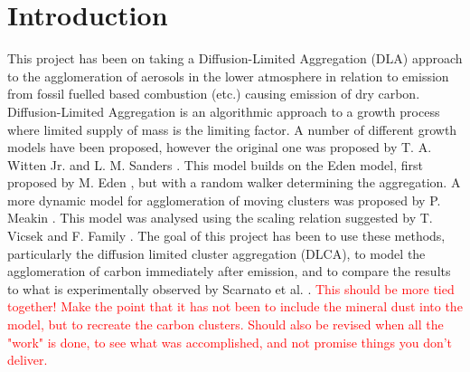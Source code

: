 \section{Introduction}

This project has been on taking a Diffusion-Limited Aggregation (DLA) approach to the agglomeration of aerosols in the lower atmosphere in relation to emission from fossil fuelled based combustion (etc.) causing emission of dry carbon. Diffusion-Limited Aggregation is an algorithmic approach to a growth process where limited supply of mass is the limiting factor. A number of different growth models have been proposed, however the original one was proposed by T. A. Witten Jr. and L. M. Sanders \cite{PhysRevLett.47.1400}. This model builds on the Eden model, first proposed by M. Eden \cite{eden1961}, but with a random walker determining the aggregation.  A more dynamic model for agglomeration of moving clusters was proposed by P. Meakin \cite{PhysRevLett.51.1119}. This model was analysed using the scaling relation suggested by T. Vicsek and F. Family \cite{PhysRevLett.52.1669}. The goal of this project has been to use these methods, particularly the diffusion limited cluster aggregation (DLCA), to model the agglomeration of carbon immediately after emission, and to compare the results to what is experimentally observed by Scarnato et al. \cite{acpd-15-2487-2015}. \textcolor{red}{This should be more tied together! Make the point that it has not been to include the mineral dust into the model, but to recreate the carbon clusters. Should also be revised when all the "work" is done, to see what was accomplished, and not promise things you don't deliver.}